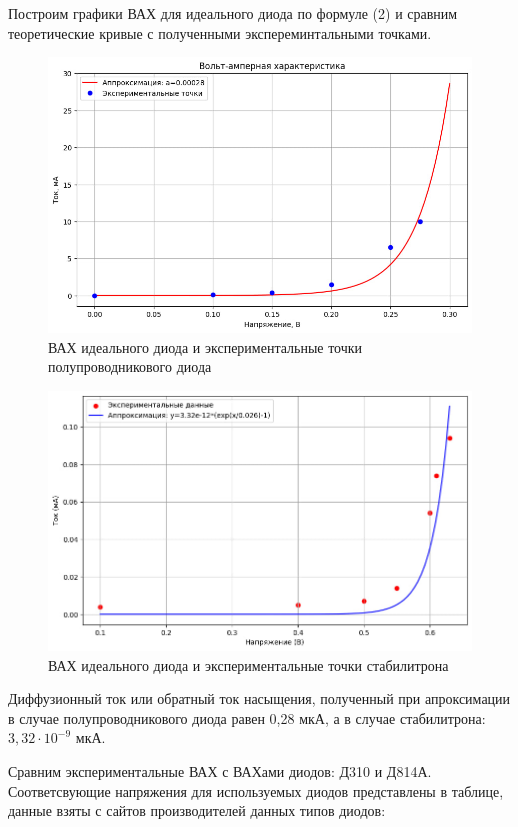 \documentclass[a4paper, 12pt]{article}
\begin{document}
Построим графики ВАХ для идеального диода по формуле (2) и сравним теоретические кривые с полученными экспереминтальными точками.
\begin{figure}[h!]
    \centering
    \includegraphics[width =0.92 \linewidth]{img/photo_5287677535850720017_y.jpg}
    \caption{ВАХ идеального диода и экспериментальные точки полупроводникового диода}
\end{figure}
\begin{figure}[h!]
    \centering
    \includegraphics[width =0.92 \linewidth]{img/photo_5289929335664405770_y.jpg}
    \caption{ВАХ идеального диода и экспериментальные точки стабилитрона}
\end{figure}

Диффузионный ток или обратный ток насыщения, полученный при апроксимации в случае полупроводникового диода равен 0,28 мкА, а в случае стабилитрона: $3,32 \cdot 10^{-9}$ мкА.

Сравним экспериментальные ВАХ с ВАХами диодов: Д310 и Д814А. Соответсвующие напряжения для используемых диодов представлены в таблице, данные взяты с сайтов производителей данных типов диодов: 
\end{document}
